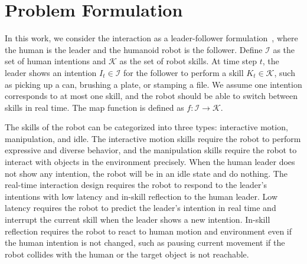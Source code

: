 \section{Problem Formulation}
\label{sec:formulation}



In this work, we consider the interaction as a leader-follower formulation~\cite{vianelloHumanHumanoidInteractionCooperation2021}, where the human is the leader and the humanoid robot is the follower.
Define $\mathcal{I}$ as the set of human intentions and $\mathcal{K}$ as the set of robot skills.
At time step $t$, the leader shows an intention $I_t \in \mathcal{I}$ for the follower to perform a skill $K_t \in \mathcal{K}$, such as picking up a can, brushing a plate, or stamping a file.
We assume one intention corresponds to at most one skill, and the robot should be able to switch between skills in real time. The map function is defined as $f: \mathcal{I} \rightarrow \mathcal{K}$.

The skills of the robot can be categorized into three types: interactive motion, manipulation, and idle.
The interactive motion skills require the robot to perform expressive and diverse behavior, and the manipulation skills require the robot to interact with objects in the environment precisely. 
When the human leader does not show any intention, the robot will be in an idle state and do nothing.
The real-time interaction design requires the robot to respond to the leader's intentions with low latency and in-skill reflection to the human leader.
Low latency requires the robot to predict the leader's intention in real time and interrupt the current skill when the leader shows a new intention.
In-skill reflection requires the robot to react to human motion and environment even if the human intention is not changed, such as pausing current movement if the robot collides with the human or the target object is not reachable.


